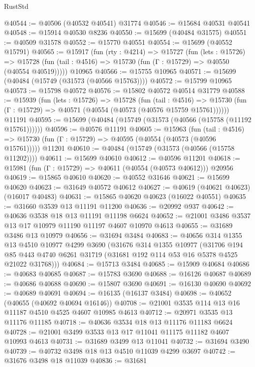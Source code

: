 \begin{lexlean}{RustStd}
\begin{coremodule}
@40544 := @40506 (@40532 @40541) @31774
@40546 := @15684 @40531 @40541
@40548 := @15914 @40530 @8236
@40550 := @15699 (@40484 @31575)
@40551 := @40509 @31578
@40552 := @15770 @40551
@40554 := @15699 (@40552 @15791)
@40565 := @15917
    (fun (rty : @4214) =>
    @15727
      (fun (lets : @15726) =>
      @15728 (fun (tail : @4516) => @15730 (fun (Γ : @15729) => @40550 (@40554 @40519)))))
    @10965
@40566 := @15755 @10965
@40571 := @15699 (@40484 (@15749 (@31573 (@40566 @15763))))
@40572 := @15799 @10965
@40573 := @15798 @40572
@40576 := @15802 @40572 @40514 @31779
@40588 := @15939
    (fun (lets : @15726) =>
    @15728
      (fun (tail : @4516) =>
      @15730 (fun (Γ : @15729) => @40571 (@40554 (@40573 (@40576 @15759 @15761))))))
    @11191
@40595 := @15699 (@40484 (@15749 (@31573 (@40566 (@15758 (@11192 @15761))))))
@40596 := @40576 @11191
@40605 := @15963
    (fun (tail : @4516) => @15730 (fun (Γ : @15729) => @40595 (@40554 (@40573 (@40596 @15761)))))
    @11201
@40610 := @40484 (@15749 (@31573 (@40566 (@15758 @11202))))
@40611 := @15699 @40610
@40612 := @40596 @11201
@40618 := @15981 (fun (Γ : @15729) => @40611 (@40554 (@40573 @40612))) @20956
@40619 := @15865 @40610
@40620 := @40552 @31646
@40621 := @15699 @40620
@40623 := @31649 @40572 @40612
@40627 := @40619 (@40621 @40623) (@16017 @40483)
@40631 := @15865 @40620 @40623 (@16022 @40551)
@40635 := @31660 @3539 @13 @11191 @11200
@40636 := @20992 @937
@40642 := @40636 @3538 @18 @13 @11191 @11198 @6624
@40652 := @21001 @3486 @3537 @13 @17 @10979 @11190 @11197 @4607 @10970 @4613
@40655 := @31689 @3486 @13 @10979
@40656 := @31694 @3484
@40683 := @40656
    @314
    @1355
    @13
    @4510
    @10977
    @4299
    @3690
    (@31676
      @314
      @1355
      @10977
      (@31706
        @194
        @85
        @443
        @4740
        @6261
        @31719
        (@31681 @192 @114 @53 @16 @5378 @4525 @21022 @31768)))
@40684 := @15713 @3484
@40685 := @15909 @40684
@40686 := @40683 @40685
@40687 := @15783 @3690
@40688 := @16126 @40687
@40689 := @40686 @40688
@40690 := @15807 @3690
@40691 := @16130 @40690
@40692 := @40689 @40691
@40694 := @16135 (@16137 @3484)
@40698 := @40652 (@40655 (@40692 @40694 @16146))
@40708 := @21001 @3535 @114 @13 @16 @11187 @4510 @4525 @4607 @10985 @4613
@40712 := @20971 @3535 @13 @11176 @11185
@40718 := @40636 @3534 @18 @13 @11176 @11183 @6624
@40728 := @21001 @3499 @3533 @13 @17 @11041 @11175 @11182 @4607 @10993 @4613
@40731 := @31689 @3499 @13 @11041
@40732 := @31694 @3490
@40739 := @40732 @3498 @18 @13 @4510 @11039 @4299 @3697
@40742 := @31676 @3498 @18 @11039
@40836 := @31681

\end{coremodule}
\end{lexlean}
